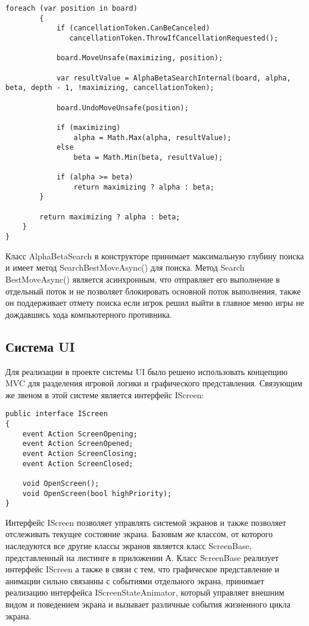 \begin{lstlisting}[caption={Реализация алгоритма альфа-бета отсечения}, label=Listing:Development:AlphaBetaSearch]
        foreach (var position in board)
        {
            if (cancellationToken.CanBeCanceled)
               cancellationToken.ThrowIfCancellationRequested();

            board.MoveUnsafe(maximizing, position);

            var resultValue = AlphaBetaSearchInternal(board, alpha, beta, depth - 1, !maximizing, cancellationToken);

            board.UndoMoveUnsafe(position);

            if (maximizing)
                alpha = Math.Max(alpha, resultValue);
            else
                beta = Math.Min(beta, resultValue);

            if (alpha >= beta)
                return maximizing ? alpha : beta;
        }

        return maximizing ? alpha : beta;
    }
}
\end{lstlisting}

Класс AlphaBetaSearch в конструкторе принимает максимальную глубину поиска и имеет метод SearchBestMoveAsync() для поиска. Метод Search \linebreak BestMoveAsync() является асинхронным, что отправляет его выполнение в отдельный поток и не позволяет блокировать основной поток выполнения, также он поддерживает отмету поиска если игрок решил выйти в главное меню игры не дождавшись хода компьютерного противника.


\subsection{Система UI}

Для реализации в проекте системы UI было решено использовать концепцию MVC для разделения игровой логики и графического представления. Связующим же звеном в этой системе является интерфейс IScreen:

\pagebreak

\begin{lstlisting}[caption={Интерфейс экрана}]
public interface IScreen
{
    event Action ScreenOpening;
    event Action ScreenOpened;
    event Action ScreenClosing;
    event Action ScreenClosed;

    void OpenScreen();
    void OpenScreen(bool highPriority);
}
\end{lstlisting}

Интерфейс IScreen позволяет управлять системой экранов и также позволяет отслеживать текущее состояние экрана. Базовым же классом, от которого наследуются все другие классы экранов является класс ScreenBase, представленный на листинге в приложении А. Класс ScreenBase реализует интерфейс IScreen а также в связи с тем, что графическое представление и анимации сильно связанны с событиями отдельного экрана, принимает реализацию интерфейса IScreenStateAnimator, который управляет внешним видом и поведением экрана и вызывает различные события жизненного цикла экрана.

